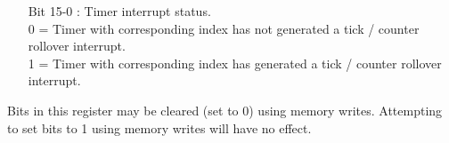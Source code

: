 \vspace{-2mm}
\begin{itemize}[leftmargin=18mm,labelsep=3mm,parsep=1.5mm]
    \item[\footnotesize Bit 15-0] : Timer interrupt status.\\{\footnotesize
    0 = Timer with corresponding index has not generated a tick / counter rollover interrupt.\\
    1 = Timer with corresponding index has generated a tick / counter rollover interrupt.}
\end{itemize}
Bits in this register may be cleared (set to 0) using memory writes. Attempting to set bits to 1 using memory writes will have no effect.